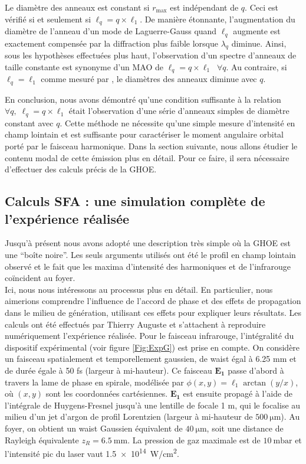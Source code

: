 Le diamètre des anneaux est constant si ${r_{{\mathrm{max}}}}$ est indépendant de $q$. Ceci est vérifié si et seulement si $\ell _q=q\times\ell_1$. De manière étonnante, l'augmentation du diamètre de l'anneau d'un mode de Laguerre-Gauss quand $\ell_q$ augmente est exactement compensée par la diffraction plus faible lorsque $\lambda_q$ diminue. Ainsi, sous les hypothèses effectuées plus haut, l'observation d'un spectre d'anneaux de taille constante est synonyme d'un MAO de $\ell_q=q\times\ell_1\;\;\forall q$. Au contraire, si $\ell_q = \ell_1$ comme mesuré par , le diamètres des anneaux diminue avec $q$. 

En conclusion, nous avons démontré qu'une condition suffisante à la relation $\forall q,\; \ell_q = q\times\ell_1$ était l'observation d'une série d'anneaux simples de diamètre constant avec $q$. Cette méthode ne nécessite qu'une simple mesure d'intensité en champ lointain et est suffisante pour caractériser le moment angulaire orbital porté par le faisceau harmonique. Dans la section suivante, nous allons étudier le contenu modal de cette émission plus en détail. Pour ce faire, il sera nécessaire d'effectuer des calculs précis de la GHOE.

\subsection{Calculs SFA : une simulation complète de l'expérience réalisée}
Jusqu'à présent nous avons adopté une description très simple où la GHOE est une ``boîte noire''. Les seuls arguments utilisés ont été le profil en champ lointain observé et le fait que les maxima d'intensité des harmoniques et de l'infrarouge coïncident au foyer.\\
Ici, nous nous intéressons au processus plus en détail. En particulier, nous aimerions comprendre l'influence de l'accord de phase et des effets de propagation dans le milieu de génération,  utilisant ces effets pour expliquer leurs résultats. Les calculs ont été effectués par Thierry Auguste et s'attachent à reproduire numériquement l'expérience réalisée. Pour le faisceau infrarouge, l'intégralité du dispositif expérimental (voir figure \ref{Fig:ExpG}) est prise en compte. On considère un faisceau spatialement et temporellement gaussien, de waist égal à 6.25 mm et de durée égale à 50 fs (largeur à mi-hauteur). Ce faisceau $\bm{E_1}$ passe d'abord à travers la lame de phase en spirale, modélisée par $\phi(x,y) = \ell_1 \arctan{(y/x)}$, où $(x,y)$ sont les coordonnées cartésiennes. $\bm{E_1}$ est ensuite propagé à l'aide de l'intégrale de Huygens-Fresnel jusqu'à une lentille de focale 1 m, qui le focalise au milieu d'un jet d'argon de profil Lorentzien (largeur à mi-hauteur de $\SI{500}{\micro\meter}$). Au foyer, on obtient un waist Gaussien équivalent de $\SI{40}{\micro\meter}$, soit une distance de Rayleigh équivalente $z_R=\SI{6,5}\mm$. La pression de gaz maximale est de $\SI{10}{\milli\bar}$ et l'intensité pic du laser vaut \SI{1,5e14}{W/cm^2}.

